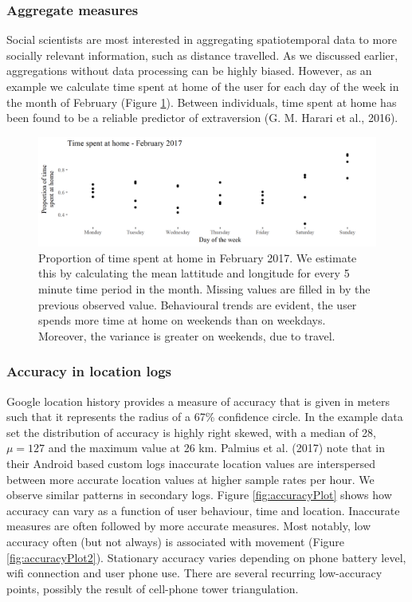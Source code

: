 \documentclass[english,man]{apa6}
\theoremstyle{definition}
\theoremstyle{definition}
\theoremstyle{definition}
\theoremstyle{remark}
\begin{document}
\subsubsection{Aggregate measures}\label{aggregate-measures}

Social scientists are most interested in aggregating spatiotemporal data
to more socially relevant information, such as distance travelled. As we
discussed earlier, aggregations without data processing can be highly
biased. However, as an example we calculate time spent at home of the
user for each day of the week in the month of February (Figure
\ref{fig:aggrePlot}). Between individuals, time spent at home has been
found to be a reliable predictor of extraversion (G. M. Harari et al.,
2016).

\begin{figure}
\includegraphics[width=1\linewidth]{img/timeUse} \caption{Proportion of time spent at home in February 2017. We estimate this by calculating the mean lattitude and longitude for every 5 minute time period in the month. Missing values are filled in by the previous observed value. Behavioural trends are evident, the user spends more time at home on weekends than on weekdays. Moreover, the variance is greater on weekends, due to travel.}\label{fig:aggrePlot}
\end{figure}

\subsubsection{Accuracy in location
logs}\label{accuracy-in-location-logs}

Google location history provides a measure of accuracy that is given in
meters such that it represents the radius of a 67\% confidence circle.
In the example data set the distribution of accuracy is highly right
skewed, with a median of 28, \(\mu = 127\) and the maximum value at 26
km. Palmius et al. (2017) note that in their Android based custom logs
inaccurate location values are interspersed between more accurate
location values at higher sample rates per hour. We observe similar
patterns in secondary logs. Figure \ref{fig:accuracyPlot} shows how
accuracy can vary as a function of user behaviour, time and location.
Inaccurate measures are often followed by more accurate measures. Most
notably, low accuracy often (but not always) is associated with movement
(Figure \ref{fig:accuracyPlot2}). Stationary accuracy varies depending
on phone battery level, wifi connection and user phone use. There are
several recurring low-accuracy points, possibly the result of cell-phone
tower triangulation.
\end{document}
